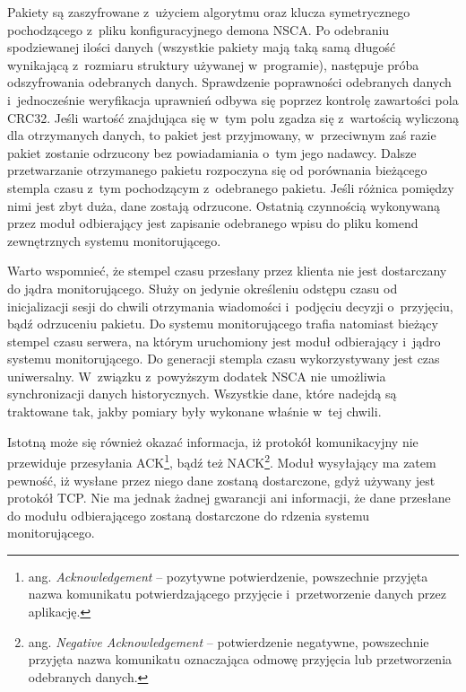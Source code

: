 Pakiety są zaszyfrowane z~użyciem algorytmu oraz klucza symetrycznego
pochodzącego z~pliku konfiguracyjnego demona NSCA. Po odebraniu
spodziewanej ilości danych (wszystkie pakiety mają taką samą długość
wynikającą z~rozmiaru struktury używanej w~programie), następuje próba
odszyfrowania odebranych danych. Sprawdzenie poprawności odebranych
danych i~jednocześnie weryfikacja uprawnień odbywa się poprzez
kontrolę zawartości pola CRC32. Jeśli wartość znajdująca się w~tym
polu zgadza się z~wartością wyliczoną dla otrzymanych danych, to
pakiet jest przyjmowany, w~przeciwnym zaś razie pakiet zostanie
odrzucony bez powiadamiania o~tym jego nadawcy. Dalsze przetwarzanie
otrzymanego pakietu rozpoczyna się od porównania bieżącego stempla
czasu z~tym pochodzącym z~odebranego pakietu. Jeśli różnica pomiędzy
nimi jest zbyt duża, dane zostają odrzucone. Ostatnią czynnością
wykonywaną przez moduł odbierający jest zapisanie odebranego wpisu do
pliku komend zewnętrznych systemu monitorującego.

Warto wspomnieć, że stempel czasu przesłany przez klienta nie jest
dostarczany do jądra monitorującego. Służy on jedynie określeniu
odstępu czasu od inicjalizacji sesji do chwili otrzymania wiadomości
i~podjęciu decyzji o~przyjęciu, bądź odrzuceniu pakietu. Do systemu
monitorującego trafia natomiast bieżący stempel czasu serwera, na
którym uruchomiony jest moduł odbierający i~jądro systemu
monitorującego. Do generacji stempla czasu wykorzystywany jest czas
uniwersalny. W~związku z~powyższym dodatek NSCA nie umożliwia
synchronizacji danych historycznych. Wszystkie dane, które nadejdą są
traktowane tak, jakby pomiary były wykonane właśnie w~tej chwili.

Istotną może się również okazać informacja, iż protokół komunikacyjny
nie przewiduje przesyłania ACK\footnote {ang. {\em Acknowledgement} --
  pozytywne potwierdzenie, powszechnie przyjęta nazwa komunikatu
  potwierdzającego przyjęcie i~przetworzenie danych przez aplikację.},
bądź też NACK\footnote{ang. {\em Negative Acknowledgement} --
  potwierdzenie negatywne, powszechnie przyjęta nazwa komunikatu
  oznaczająca odmowę przyjęcia lub przetworzenia odebranych
  danych.}. Moduł wysyłający ma zatem pewność, iż wysłane przez niego
dane zostaną dostarczone, gdyż używany jest protokół TCP.  Nie ma
jednak żadnej gwarancji ani informacji, że dane przesłane do modułu
odbierającego zostaną dostarczone do rdzenia systemu monitorującego.

